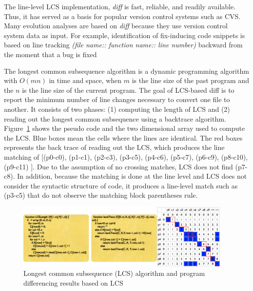 The line-level LCS implementation, \textit{diff} \cite{Hunt1977:LCS} is fast, reliable, and readily available. Thus, it has served as a basis for popular version control systems such as CVS. Many evolution analyses are based on {\it diff} because they use version control system data as input. For example, identification of fix-inducing code snippets is based on line tracking \textit{(file name:: function name:: line number)} backward from the moment that a bug is fixed~\cite{Sliwerski:2005} 

The longest common subsequence algorithm is a dynamic programming algorithm with $O(mn)$ in time and space, when $m$ is the line size of the past program and the $n$ is the line size of the current program. The goal of LCS-based diff is to report the minimum number of line changes necessary to convert one file to another. It consists of two phases: (1) computing the length of LCS and (2) reading out the longest common subsequence using a backtrace algorithm. Figure~\ref{fig:lcs} shows the pseudo code and the two dimensional array used to compute the LCS. Blue boxes mean the cells where the lines are identical. The red boxes represents the back trace of reading out the LCS, which produces the line matching of [(p0-c0), (p1-c1), (p2-c3), (p3-c5), (p4-c6), (p5-c7), (p6-c9), (p8-c10), (p9-c11) ]. Due to the assumption of no crossing matches, LCS does not find (p7-c8). In addition, because the matching is done at the line level and LCS does not consider the syntactic structure of code, it produces a line-level match such as (p3-c5) that do not observe the matching block parentheses rule. 

\begin{figure}
\centering
\includegraphics[width=0.95\textwidth]{images/LCS.pdf}
\caption{Longest common subsequence (LCS) algorithm and program differencing results based on LCS}
\label{fig:lcs} 
\end{figure}


